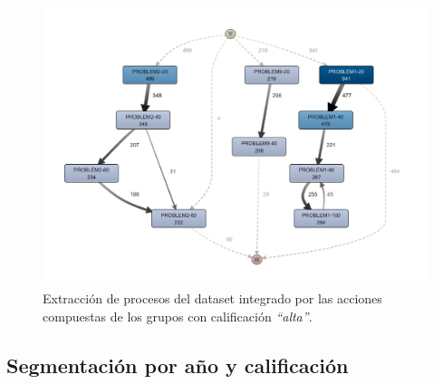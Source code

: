 \begin{figure}[H]
    \centering
    \includegraphics[width=1.25\textwidth]{imagenes/DISCO_compound/BestGrades.png}
    \caption{Extracción de procesos del dataset integrado por las acciones compuestas de los grupos con calificación \emph{``alta''}.}
    \label{fig:bestGrades}
\end{figure}


\subsection{Segmentación por año y calificación}

